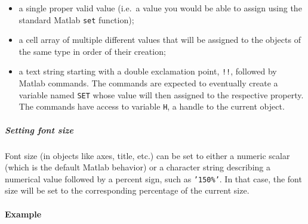 \begin{itemize}
\item
  a single proper valid value (i.e.~a value you would be able to assign
  using the standard Matlab \texttt{set} function);
\item
  a cell array of multiple different values that will be assigned to the
  objects of the same type in order of their creation;
\item
  a text string starting with a double exclamation point, \texttt{!!},
  followed by Matlab commands. The commands are expected to eventually
  create a variable named \texttt{SET} whose value will then assigned to
  the respective property. The commands have access to variable
  \texttt{H}, a handle to the current object.
\end{itemize}

\subparagraph{Setting font size}

Font size (in objects like axes, title, etc.) can be set to either a
numeric scalar (which is the default Matlab behavior) or a character
string describing a numerical value followed by a percent sign, such as
\texttt{'150\%'}. In that case, the font size will be set to the
corresponding percentage of the current size.

\paragraph{Example}


